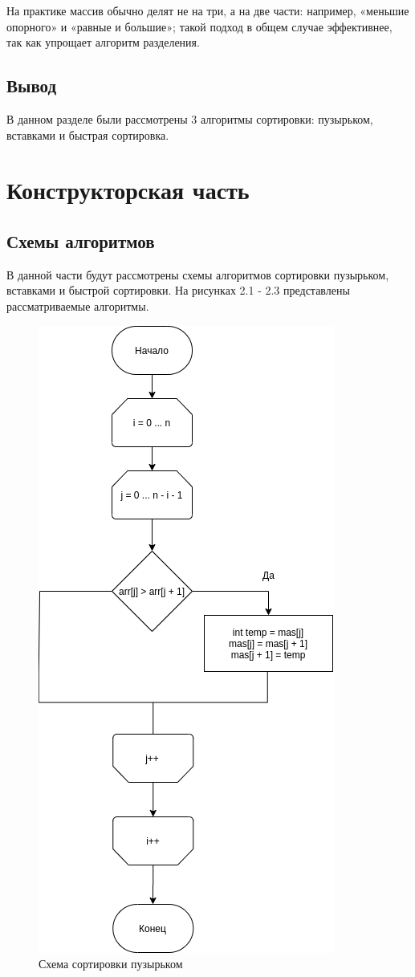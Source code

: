 \documentclass[12pt]{report}
\begin{document}
На практике массив обычно делят не на три, а на две части: например, «меньшие опорного» и «равные и большие»; такой подход в общем случае эффективнее, так как упрощает алгоритм разделения.

\section{Вывод}
	В данном разделе были рассмотрены 3 алгоритмы сортировки: пузырьком, вставками и быстрая сортировка.
	
\clearpage

\chapter{Конструкторская часть}

\section{Схемы алгоритмов}
В данной части будут рассмотрены схемы алгоритмов сортировки пузырьком, вставками и быстрой сортировки. На рисунках 2.1 - 2.3 представлены рассматриваемые алгоритмы.

\begin{figure}[h]
	\centering
	\includegraphics[width=0.4\linewidth]{bsort.jpg}
	\caption{Схема сортировки пузырьком}
	\label{fig:mpr}
\end{figure}

\newpage
\end{document}
